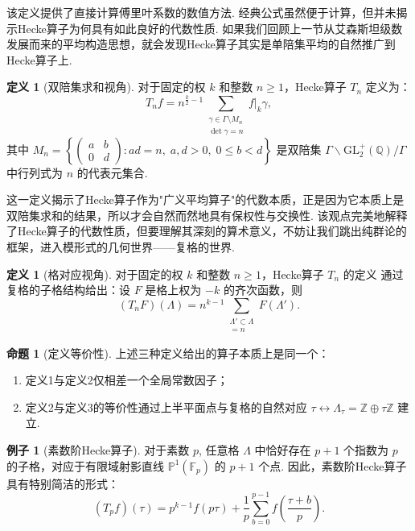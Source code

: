 \documentclass[10pt,UTF8]{ctexart}
\newcommand{\Z}{\mathbb{Z}}
\newcommand{\Q}{\mathbb{Q}}
\theoremstyle{definition}
\newtheorem{proposition}[theorem]{命题}
\newtheorem{definition}[theorem]{定义}
\newtheorem{example}[theorem]{例子}
\theoremstyle{remark}
\begin{document}
该定义提供了直接计算傅里叶系数的数值方法. 经典公式虽然便于计算，但并未揭示Hecke算子为何具有如此良好的代数性质. 如果我们回顾上一节从艾森斯坦级数发展而来的平均构造思想，就会发现Hecke算子其实是单陪集平均的自然推广到Hecke算子上. 

\begin{definition}[双陪集求和视角]
对于固定的权 $k$ 和整数 $n\geq 1$，Hecke算子 $T_n$ 定义为：
\[
\displaystyle T_n f = n^{\frac{k}{2}-1}\sum_{\substack{\gamma\in\Gamma\setminus M_n\\ \det\gamma=n}} f|_k\gamma,
\]
其中 $M_n = \left\{ \begin{pmatrix}a&b\\0&d\end{pmatrix} : ad=n,\; a,d>0,\; 0\leq b<d \right\}$ 是双陪集 $\Gamma\backslash\mathrm{GL}_2^+(\Q)/\Gamma$ 中行列式为 $n$ 的代表元集合. 

\end{definition}

这一定义揭示了Hecke算子作为"广义平均算子"的代数本质，正是因为它本质上是双陪集求和的结果，所以才会自然而然地具有保权性与交换性. 该观点完美地解释了Hecke算子的代数性质，但要理解其深刻的算术意义，不妨让我们跳出纯群论的框架，进入模形式的几何世界——复格的世界. 

\begin{definition}[格对应视角]
对于固定的权 $k$ 和整数 $n\geq 1$，Hecke算子 $T_n$ 的定义 通过复格的子格结构给出：设 $F$ 是格上权为 $-k$ 的齐次函数，则
\[
\displaystyle (T_n F)(\Lambda) = n^{k-1}\sum_{\substack{\Lambda'\subset\Lambda\\ [\Lambda:\Lambda']=n}} F(\Lambda').
\]
\end{definition}

\begin{proposition}[定义等价性]
上述三种定义给出的算子本质上是同一个：
\begin{enumerate}
    \item 定义1与定义2仅相差一个全局常数因子；
    \item 定义2与定义3的等价性通过上半平面点与复格的自然对应 $\tau \leftrightarrow \Lambda_\tau = \Z\oplus\tau\Z$ 建立. 
\end{enumerate}
\end{proposition}

\begin{example}[素数阶Hecke算子]
对于素数 $p$, 任意格 $\Lambda$ 中恰好存在 $p+1$ 个指数为 $p$ 的子格，对应于有限域射影直线 $\mathbb P^1(\mathbb F_p)$ 的 $p+1$ 个点. 因此，素数阶Hecke算子具有特别简洁的形式：
\[
(T_p f)(\tau) = p^{k-1} f(p\tau) + \frac1p\sum_{b=0}^{p-1} f\!\left(\frac{\tau+b}{p}\right).
\]
\end{example}
\end{document}
